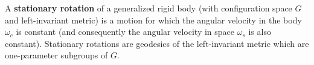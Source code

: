 A \textbf{stationary rotation} of a generalized rigid body (with configuration space $G$ and left-invariant metric) is a motion for which the angular velocity in the body $\omega_c$ is constant (and consequently the angular velocity in space $\omega_s$ is also constant). Stationary rotations are geodesics of the left-invariant metric which are one-parameter subgroups of $G$.
